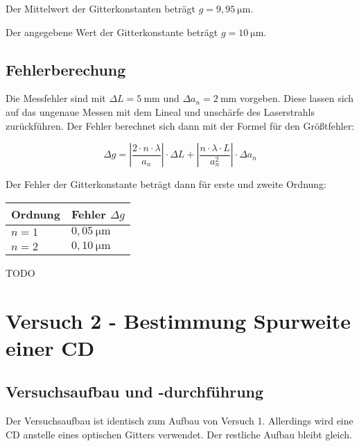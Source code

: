         Der Mittelwert der Gitterkonstanten beträgt $g = 9,95\ \mathrm{\mu m}$.

        Der angegebene Wert der Gitterkonstante beträgt $g = 10\ \mathrm{\mu m}$.
    
    \subsection{Fehlerberechung}
        
        Die Messfehler sind mit $\Delta L = 5\ \mathrm{mm}$ und $\Delta a_{n} = 2\ \mathrm{mm}$ vorgeben. Diese lassen sich auf das ungenaue Messen mit dem Lineal und unschärfe des Laserstrahls zurückführen. Der Fehler berechnet sich dann mit der Formel für den Größtfehler:

        $$\Delta g = \left|\frac{2 \cdot n \cdot \lambda}{a_{n}}\right| \cdot \Delta L + \left|\frac{n \cdot \lambda \cdot L}{a_{n}^{2}}\right| \cdot \Delta a_{n}$$

        Der Fehler der Gitterkonstante beträgt dann für erste und zweite Ordnung:

        \begin{table}[H]
            \centering
            \begin{tabular}{|l|l|}
                \hline
                Ordnung & Fehler $\Delta g$\\
                \hline
                $n = 1$ & $0,05\ \mathrm{\mu m}$\\
                \hline
                $n = 2$ & $0,10\ \mathrm{\mu m}$\\
                \hline
            \end{tabular}
        \end{table}

        TODO

\section{Versuch 2 - Bestimmung Spurweite einer CD}
    
    \subsection{Versuchsaufbau und -durchführung}
        
        Der Versuchsaufbau ist identisch zum Aufbau von Versuch 1. Allerdings wird eine CD anstelle eines optischen Gitters verwendet. Der restliche Aufbau bleibt gleich.

